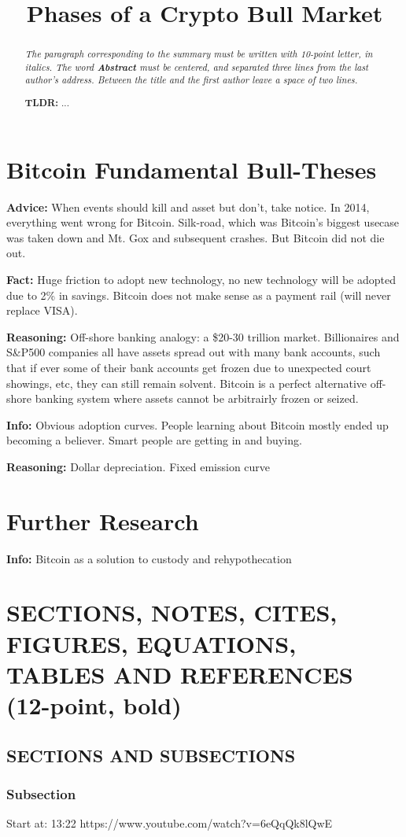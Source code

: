 \documentclass[10pt,twocolumn]{article}
\title{Phases of a Crypto Bull Market\vspace{-2em}}
\date{}
\begin{document}
\setlength{\parskip}{10px}%
\setlength{\parindent}{0pt}
\setlength{\footskip}{1.5em}
\maketitle
\begin{abstract}
{\em The paragraph corresponding to the summary must be written with 10-point
letter, in italics. The word {\bf Abstract} must be centered, and separated
three lines from the last author's address. Between the title and the first
author leave a space of two lines.}
    
{\bf TLDR:} ...
\end{abstract}

\section{Bitcoin Fundamental Bull-Theses}

{\bf Advice:} When events should kill and asset but don't, take notice. In 2014,
everything went wrong for Bitcoin. Silk-road, which was Bitcoin's biggest
usecase was taken down and Mt. Gox and subsequent crashes. But Bitcoin did not
die out. 

{\bf Fact:} Huge friction to adopt new technology, no new technology will be
adopted due to 2\% in savings. Bitcoin does not make sense as a payment rail
(will never replace VISA). 

{\bf Reasoning:} Off-shore banking analogy: a \$20-30 trillion market.
Billionaires and S\&P500 companies all have assets spread out with many bank
accounts, such that if ever some of their bank accounts get frozen due to
unexpected court showings, etc, they can still remain solvent. Bitcoin is a
perfect alternative off-shore banking system where assets cannot be arbitrairly
frozen or seized. 

{\bf Info:} Obvious adoption curves. People learning about Bitcoin mostly ended
up becoming a believer. Smart people are getting in and buying. 

{\bf Reasoning:} Dollar depreciation. Fixed emission curve



\section{Further Research}
{\bf Info:} Bitcoin as a solution to custody and rehypothecation

\section{SECTIONS, NOTES, CITES, FIGURES, EQUATIONS, TABLES AND REFERENCES (12-point, bold)}
\subsection{SECTIONS AND SUBSECTIONS}
\subsubsection{Subsection}
Start at: 13:22 
https://www.youtube.com/watch?v=6eQqQk8lQwE
\end{document}
